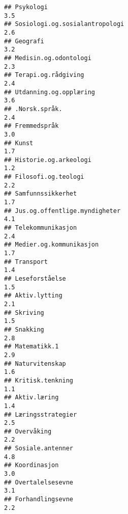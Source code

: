 \documentclass[
]{article}
\begin{document}
\begin{verbatim}
## Psykologi                                                                        3.5
## Sosiologi.og.sosialantropologi                                                   2.6
## Geografi                                                                         3.2
## Medisin.og.odontologi                                                            2.3
## Terapi.og.rådgiving                                                              2.4
## Utdanning.og.opplæring                                                           3.6
## .Norsk.språk.                                                                    2.4
## Fremmedspråk                                                                     3.0
## Kunst                                                                            1.7
## Historie.og.arkeologi                                                            1.2
## Filosofi.og.teologi                                                              2.2
## Samfunnssikkerhet                                                                1.7
## Jus.og.offentlige.myndigheter                                                    4.1
## Telekommunikasjon                                                                2.4
## Medier.og.kommunikasjon                                                          1.7
## Transport                                                                        1.4
## Leseforståelse                                                                   1.5
## Aktiv.lytting                                                                    2.1
## Skriving                                                                         1.5
## Snakking                                                                         2.8
## Matematikk.1                                                                     2.9
## Naturvitenskap                                                                   1.6
## Kritisk.tenkning                                                                 1.1
## Aktiv.læring                                                                     1.4
## Læringsstrategier                                                                2.5
## Overvåking                                                                       2.2
## Sosiale.antenner                                                                 4.8
## Koordinasjon                                                                     3.0
## Overtalelsesevne                                                                 3.1
## Forhandlingsevne                                                                 2.2

\end{verbatim}
\end{document}
